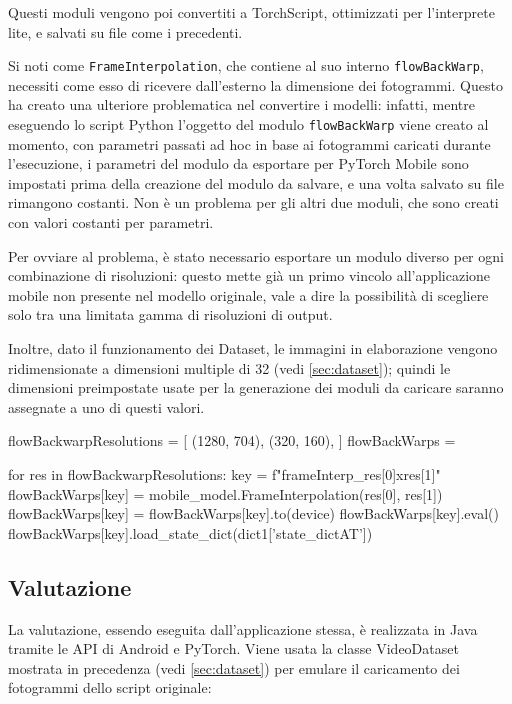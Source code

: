 Questi moduli vengono poi convertiti a TorchScript, ottimizzati per l'interprete lite, 
e salvati su file come i precedenti.

Si noti come \texttt{FrameInterpolation}, che contiene al suo interno \texttt{flowBackWarp}, 
necessiti come esso di ricevere dall'esterno la dimensione dei fotogrammi. Questo ha creato una
ulteriore problematica nel convertire i modelli: infatti, mentre eseguendo lo script Python
l'oggetto del modulo \texttt{flowBackWarp} viene creato al momento, con parametri passati ad
hoc in base ai fotogrammi caricati durante l'esecuzione, i parametri del modulo da esportare
per PyTorch Mobile sono impostati prima della creazione del modulo da salvare, e una volta 
salvato su file rimangono costanti. Non è un problema per gli altri due moduli, che sono creati
con valori costanti per parametri. 

Per ovviare al problema, è stato necessario esportare un modulo diverso per ogni combinazione
di risoluzioni: questo mette già un primo vincolo all'applicazione mobile non presente
nel modello originale, vale a dire la possibilità di scegliere solo tra una limitata gamma di
risoluzioni di output.

Inoltre, dato il funzionamento dei Dataset, le immagini in elaborazione vengono ridimensionate 
a dimensioni multiple di 32 (vedi \ref{sec:dataset}); quindi le dimensioni preimpostate usate
per la generazione dei moduli da caricare saranno assegnate a uno di questi valori.

\begin{Python}
flowBackwarpResolutions = [
    (1280, 704),
    (320, 160),
]
flowBackWarps = {}

for res in flowBackwarpResolutions:
    key = f"frameInterp_{res[0]}x{res[1]}"
    flowBackWarps[key] = mobile_model.FrameInterpolation(res[0], res[1])
    flowBackWarps[key] = flowBackWarps[key].to(device)
    flowBackWarps[key].eval()
    flowBackWarps[key].load_state_dict(dict1['state_dictAT'])
\end{Python}

\subsection{Valutazione}

La valutazione, essendo eseguita dall'applicazione stessa, è realizzata in Java
tramite le API di Android e PyTorch. Viene usata la classe VideoDataset mostrata in precedenza
(vedi \ref{sec:dataset}) per emulare il caricamento dei fotogrammi dello script originale:

